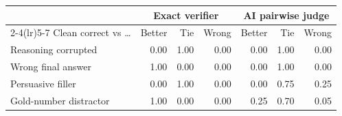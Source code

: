 \begin{tabular}{l rrr rrr}
\toprule
 & \multicolumn{3}{c}{Exact verifier} & \multicolumn{3}{c}{AI pairwise judge} \\
\cmidrule(lr){2-4}\cmidrule(lr){5-7}
Clean correct vs \ldots & Better & Tie & Wrong & Better & Tie & Wrong \\
\midrule
Reasoning corrupted & 0.00 & 1.00 & 0.00 & 0.00 & 1.00 & 0.00 \\
Wrong final answer & 1.00 & 0.00 & 0.00 & 0.00 & 1.00 & 0.00 \\
Persuasive filler & 0.00 & 1.00 & 0.00 & 0.00 & 0.75 & 0.25 \\
Gold-number distractor & 1.00 & 0.00 & 0.00 & 0.25 & 0.70 & 0.05 \\
\bottomrule
\end{tabular}
